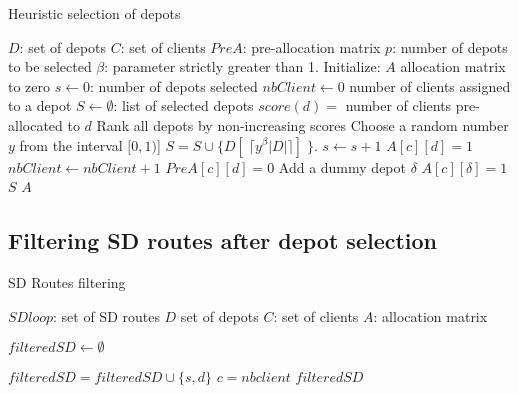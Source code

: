 \documentclass[a4paper,10pt]{article}
\begin{document}
\begin{linenumbers}
\begin{algorithm}
	\caption{Heuristic selection of depots}
	\label{algo:location-sampling}
	\begin{algorithmic}[1]
		\REQUIRE $D$: set of depots
		\REQUIRE $C$: set of clients
		\REQUIRE $PreA$: pre-allocation matrix
		\REQUIRE $p$: number of depots to be selected
		\REQUIRE $\beta$: parameter strictly greater than 1.
		\STATE Initialize: $A$ allocation matrix to zero
		\STATE $s\leftarrow 0$: number of depots selected
		\STATE $nbClient \leftarrow 0$ number of clients assigned to a depot
		\STATE $S \leftarrow \emptyset$: list of selected depots
				\STATE $score(d) =$ number of clients pre-allocated to $d$
			\ENDFOR
			\STATE Rank all depots by non-increasing scores
			\STATE Choose a random number $y$ from the interval $[0,1)$]
			\STATE $ S = S \cup \{D[\;\lceil y^\beta |D| \rceil]\; \}$.
			\STATE $s \leftarrow s +1$
					\STATE $A[c][d] = 1$
					\STATE $nbClient \leftarrow nbClient +1$
						\STATE $PreA[c][d] = 0$
					\ENDFOR
				\ENDIF		
			\ENDFOR
		\ENDWHILE
			\STATE Add a dummy depot $\delta$
				\STATE $A[c][\delta]=1$
			\ENDFOR
		\ENDIF
		\RETURN $S$
		\RETURN $A$
	\end{algorithmic}
\end{algorithm}



\newpage
\subsection{Filtering SD routes after depot selection}

\begin{algorithm}
	\caption{SD Routes filtering}
	\label{algo:filteringSD}
	\begin{algorithmic}[1]
		\REQUIRE $SDloop$: set of SD routes
		\REQUIRE $D$ set of depots
		\REQUIRE $C$: set of clients
		\REQUIRE $A$: allocation matrix
		
		\STATE $filteredSD \leftarrow \emptyset$
		
					\STATE $filteredSD = filteredSD \cup \{s,d\}$
					\STATE $c = nbclient$
				\ENDIF
			\ENDFOR
		\ENDFOR
		\RETURN $filteredSD$
	\end{algorithmic}
\end{algorithm}



\end{linenumbers}
\end{document}
